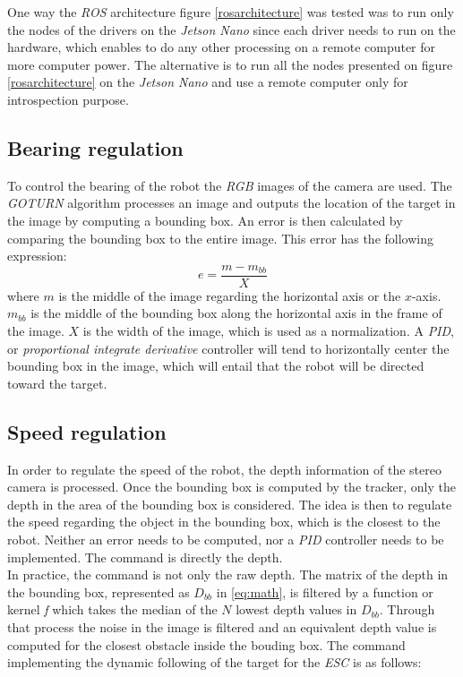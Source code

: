 		\FloatBarrier
		
		One way the \textit{ROS} architecture figure 
		\vref{rosarchitecture} was tested
		was to run only the nodes of the drivers on
		the \textit{Jetson Nano} since each driver needs
		to run on the hardware, which enables to do 
		any other processing on a remote computer
		for more computer power. The alternative is to run 
		all the nodes presented on figure 
		\vref{rosarchitecture} on the \textit{Jetson Nano} and 
		use a remote computer only for
		introspection purpose.
		
		\subsection{Bearing regulation}\label{speed}
			
		To control the bearing of the robot the \textit{RGB} images 
		of the camera are used. The \textit{GOTURN} algorithm 
		processes an image and outputs the location of the 
		target in the image by computing a bounding box. An
		error is then calculated by comparing the bounding box
		to the entire image. This error  has the following expression:
		\begin{equation}
			e = \frac{m - m_{bb}}{X}
		\end{equation}
		where $m$ is the middle of the image regarding the horizontal 
		axis or the $x$-axis. $m_{bb}$ is the middle of the bounding
		box along the horizontal axis in the frame of 
		the image. $X$ is the width of the image, which is used
		as a normalization. A \textit{PID}, or \textit{proportional
		integrate derivative} controller will tend
		to horizontally center the bounding box in the image, which 
		will entail that the robot will be directed toward 
		the target.
		
		\subsection{Speed regulation}
		
		In order to regulate the speed of the robot, the depth 
		information of the stereo camera is processed. Once the 
		bounding box is computed by the tracker, only 
		the depth in the area of the bounding box is considered.
		The idea is then to regulate the speed regarding the object
		in the bounding box, which is the closest to the robot.
		Neither an error needs to be computed, nor a \textit{PID}
		controller 
		needs to be implemented. The command is
		directly the depth.
		\\\indent In practice, the command is not only the raw depth.
		The matrix of the depth in the bounding box, represented 
		as $D_{bb}$ in \eqref{eq:math}, is filtered
		by a function or kernel \textit{f} which takes the median 
		of the $N$ lowest depth values in $D_{bb}$. Through that 
		process the noise in the image is filtered and
		an equivalent depth value is computed for the closest
		obstacle inside the bouding box.
		The command implementing the dynamic following of the target
		for the \textit{ESC} is as follows:
		
